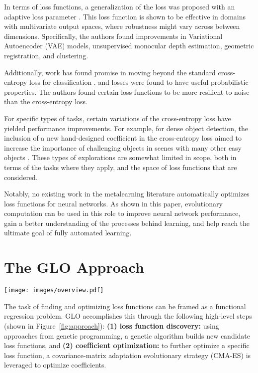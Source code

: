 \documentclass[conference]{IEEEtran}
\newcommand{\TECH}{GLO\xspace}
\begin{document}
In terms of loss functions, a generalization of the  loss was
proposed with an adaptive loss parameter \cite{barron2019general}. This loss function is shown to be effective in domains with multivariate output spaces, where robustness might vary across between dimensions. Specifically, the authors found improvements in Variational Autoencoder (VAE) models, unsupervised monocular depth estimation, geometric registration, and clustering.

Additionally, work has found promise in moving beyond the standard cross-entropy loss for classification \cite{janocha2017loss}.  and  losses were found to have useful probabilistic properties. The authors found certain loss functions to be more resilient to noise than the cross-entropy loss.

For specific types of tasks, certain variations of the cross-entropy loss have yielded performance improvements. For example, for dense object detection, the inclusion of a new hand-designed coefficient in the cross-entropy loss aimed to increase the importance of challenging objects in scenes with many other easy objects \cite{lin2017focal}. These types of explorations are somewhat limited in scope, both in terms of the tasks where they apply, and the space of loss functions that are considered.

Notably, no existing work in the metalearning literature automatically optimizes loss functions for neural networks. As shown in this paper, evolutionary computation can be used in this role to improve neural network performance, gain a better understanding of the processes behind learning, and help reach the ultimate goal of fully automated learning.


\section{The GLO Approach}

\begin{figure*}
  \centering
\texttt{[image: images/overview.pdf]}
  \caption{Genetic Loss Optimization (\TECH) overview. A genetic algorithm constructs candidate loss functions as trees. The best loss functions from this set then has its coefficients optimized using CMA-ES. \TECH loss functions are able to train models more quickly and more accurately.}
  \label{fig:approach}
\end{figure*}

The task of finding and optimizing loss functions can be framed as a functional regression problem. \TECH accomplishes this through the following high-level steps (shown in Figure~\ref{fig:approach}): \textbf{(1) loss function discovery:} using approaches from genetic programming, a genetic algorithm builds new candidate loss functions, and \textbf{(2) coefficient optimization:} to further optimize a specific loss function, a covariance-matrix adaptation evolutionary strategy (CMA-ES) is leveraged to optimize coefficients.
\end{document}
